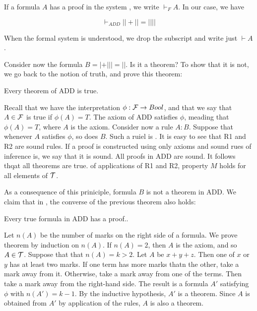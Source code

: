 If a formula $A$ has a proof in the system , we write $\vdash_F A$.  In our case, we have

$$
\vdash_{ADD} || + ||  = ||||
$$

When the formal system is understood, we drop the subscript and write just $\vdash A$.

Consider now the formula $B = | + ||| = ||$.  Is it a theorem? To show that it is not, we go back to the notion of truth, and prove this theorem:

\begin{theorem}
\label{add:soundness}
Every theorem of ADD is true.
\end{theorem}



 Recall that we have the interpretation $\phi: \mathcal{F} \to Bool$, and that we say that $A \in \mathcal{F}$ is true if $\phi(A) = T$. The axiom of ADD satisfies $\phi$, meading that $\phi(A) = T$, where $A$ is the axiom.   Consider now a rule $A : B$. Suppose that whenever $A$ satisfies $\phi$, so does $B$.  Such a ruiel is .  It is easy to see that R1 and R2 are sound rules.  If a proof is constructed using only axioms and sound rues of inference is, we say that it is sound.
All proofs in ADD are sound. It follows thqat all theorems are true. of applications of R1 and R2, property $M$ holds for all elements of $\mathcal{T}$. 

As a consequence of this priniciple, formula $B$ is not a theorem in ADD.
We claim that in , the converse of the previous theorem also holds:

\begin{theorem}
\label{add:completeness}
Every true formula in ADD has a proof..
\end{theorem}

 Let $n(A)$ be the number of marks on the right side of a formula. We prove theorem by induction on $n(A)$.  If $n(A) = 2$, then $A$ is the axiom, and so $A \in \mathcal{T}$.  Suppose that that $n(A) = k > 2$.  Let $A$ be $x + y + z$.  Then one of $x$ or $y$ has at least two marks.  If one term has more marks thatn the other, take a mark away from it.  Otherwise, take a mark away from one of the terms.  Then take a mark away from the right-hand side.  The result is a formula $A'$ satisfying $\phi$ with $n(A') = k - 1$. By the inductive hypothesis, $A'$ is a theorem.  Since $A$ is obtained from $A'$ by application of the rules, $A$ is also a theorem. 


